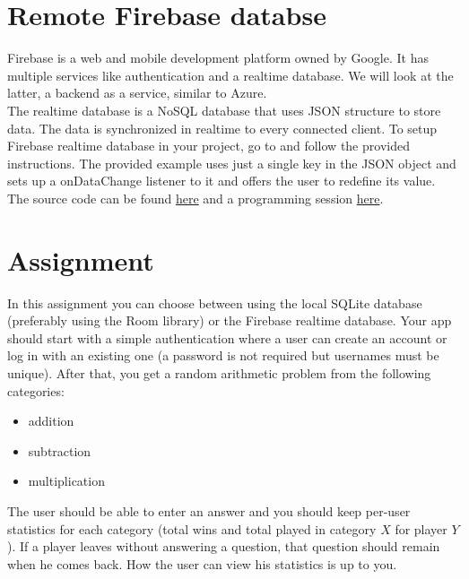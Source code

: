 \section{Remote Firebase databse}
Firebase is a web and mobile development platform owned by Google. It has multiple services like authentication and a realtime database. We will look at the latter, a backend as a service, similar to Azure.\\

The realtime database is a NoSQL database that uses JSON structure to store data. The data is synchronized in realtime to every connected client. To setup Firebase realtime database in your project, go to  and follow the provided instructions. The provided example uses just a single key in the JSON object and sets up a onDataChange listener to it and offers the user to redefine its value. The source code can be found \href{https://github.com/JonSteinn/AndroidDevelopment/tree/master/examples/lab5/firebase}{here} and a programming session \href{https://www.youtube.com/watch?v=TmHsO5nmy7s}{here}.

\section{Assignment}
In this assignment you can choose between using the local SQLite database (preferably using the Room library) or the Firebase realtime database. Your app should start with a simple authentication where a user can create an account or log in with an existing one (a password is not required but usernames must be unique). After that, you get a random arithmetic problem from the following categories:
\begin{itemize}
\item addition
\item subtraction
\item multiplication
\end{itemize}
The user should be able to enter an answer and you should keep per-user statistics for each category (total wins and total played in category $X$ for player $Y$). If a player leaves without answering a question, that question should remain when he comes back. How the user can view his statistics is up to you.